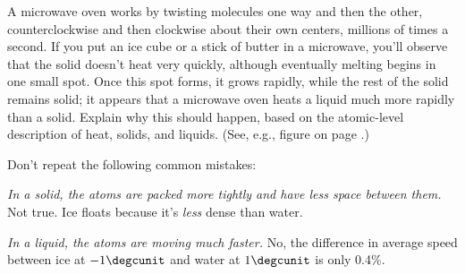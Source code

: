 A microwave oven works by twisting molecules one way and
then the other, counterclockwise and then clockwise about
their own centers, millions of times a second. If you put an
ice cube or a stick of butter in a microwave, you'll observe
that the solid doesn't heat very quickly, although
eventually melting begins in one small spot. Once this
spot forms, it grows rapidly, while the rest of the solid
remains solid; it appears
that a microwave oven heats a liquid much more
rapidly than a solid. Explain why this should happen, based
on the atomic-level description of heat, solids, and liquids.
(See, e.g., figure  on page \pageref{fig:random-motion}.)

Don't repeat the following common mistakes:

\noindent\emph{In a solid, the atoms are packed more tightly and have less
space between them.} Not true. Ice floats because it's \emph{less} dense
than water.

\noindent\emph{In a liquid, the atoms are moving much faster.} No, the difference
in average speed between ice at $-1\degcunit$ and water at $1\degcunit$ is
only 0.4\%.
